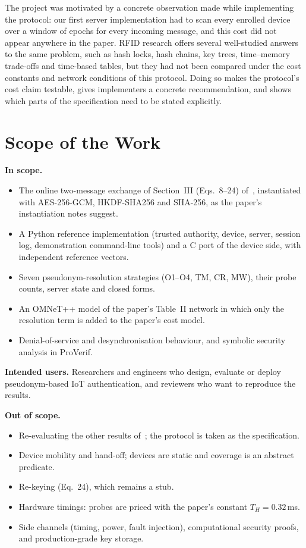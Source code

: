 The project was motivated by a concrete observation made while implementing the protocol: our first server implementation had to scan every enrolled device over a window of epochs for every incoming message, and this cost did not appear anywhere in the paper. RFID research offers several well-studied answers to the same problem, such as hash locks, hash chains, key trees, time--memory trade-offs and time-based tables, but they had not been compared under the cost constants and network conditions of this protocol. Doing so makes the protocol's cost claim testable, gives implementers a concrete recommendation, and shows which parts of the specification need to be stated explicitly.

\section{Scope of the Work}
\textbf{In scope.}
\begin{itemize}
\item The online two-message exchange of Section~III (Eqs.~8--24) of~\cite{base}, instantiated with AES-256-GCM, HKDF-SHA256 and SHA-256, as the paper's instantiation notes suggest.
\item A Python reference implementation (trusted authority, device, server, session log, demonstration command-line tools) and a C port of the device side, with independent reference vectors.
\item Seven pseudonym-resolution strategies (O1--O4, TM, CR, MW), their probe counts, server state and closed forms.
\item An OMNeT++ model of the paper's Table~II network in which only the resolution term is added to the paper's cost model.
\item Denial-of-service and desynchronisation behaviour, and symbolic security analysis in ProVerif.
\end{itemize}
\textbf{Intended users.} Researchers and engineers who design, evaluate or deploy pseudonym-based IoT authentication, and reviewers who want to reproduce the results.

\textbf{Out of scope.}
\begin{itemize}
\item Re-evaluating the other results of~\cite{base}; the protocol is taken as the specification.
\item Device mobility and hand-off; devices are static and coverage is an abstract predicate.
\item Re-keying (Eq.~24), which remains a stub.
\item Hardware timings: probes are priced with the paper's constant $T_H=0.32$\,ms.
\item Side channels (timing, power, fault injection), computational security proofs, and production-grade key storage.
\end{itemize}

